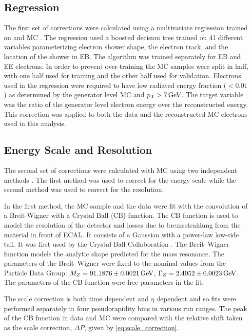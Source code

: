 \subsection{Regression}

The first set of corrections were calculated using a multivariate regression
trained on \Ztoee and \higgstoZZ MC \cite{cms_an_2012-327}. The regression used
a boosted decision tree trained on 41 different variables parameterizing
electron shower shape, the electron track, and the location of the shower in
EB. The algorithm was trained separately for EB and EE electrons. In order to
prevent over-training the MC samples were split in half, with one half used for
training and the other half used for validation. Electrons used in the
regression were required to have low radiated energy fraction ($< 0.01$) as
determined by the generator level MC and $p_{\mathrm{T}} > 7 \,\text{Ge\hspace{-.08em}V}$. The target variable
was the ratio of the generator level \bare electron energy over the
reconstructed energy. This correction was applied to both the data and the
reconstructed MC electrons used in this analysis.

\subsection{Energy Scale and Resolution}

The second set of corrections were calculated with \Ztoee MC using two
independent methods \cite{cms_an_2013-253}. The first method was used to
correct for the energy scale while the second method was used to correct for
the resolution.

In the first method, the MC sample and the data were fit with the convolution
of a Breit-Wigner with a Crystal Ball (CB) function. The CB function is used to
model the resolution of the detector and losses due to bremsstrahlung from the
material in front of ECAL. It consists of a Gaussian with a power-law low-side
tail. It was first used by the Crystal Ball Collaboration \cite{oreglia_1980}.
The Breit--Wigner function models the analytic shape predicted for the \Z mass
resonance. The parameters of the Breit--Wigner were fixed to the nominal values
from the Particle Data Group: $M_{Z} = 91.1876 \pm 0.0021 \,\text{Ge\hspace{-.08em}V}$, $\Gamma_{Z} = 2.4952 \pm 0.0023 \,\text{Ge\hspace{-.08em}V}$. The
parameters of the CB function were free parameters in the fit.

The scale correction is both time dependent and $\eta$ dependent and so fits
were performed separately in four pseudorapidity bins in various run ranges.
The peak of the CB function in data and MC were compared with the relative
shift taken as the scale correction, $\Delta P$, given by
\cref{eq:scale_correction}.

